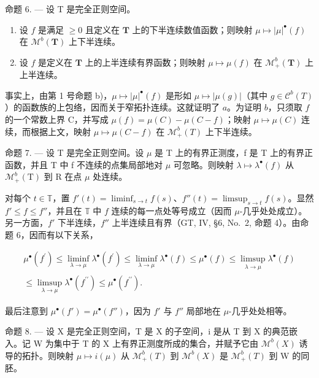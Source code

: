 命题 6. --- 设 T 是完全正则空间。

\begin{enumerate}
\def\labelenumi{\alph{enumi})}
\item
  设 \(f\) 是满足 \(\geqslant 0\) 且定义在 \(\mathbf{T}\) 上的下半连续数值函数；则映射 \(\mu \mapsto |\mu|^{\bullet}(f)\) 在 \(\mathcal{M}^b(\mathbf{T})\) 上下半连续。
\item
  设 \(f\) 是定义在 \(\mathbf{T}\) 上的上半连续有界函数；则映射 \(\mu \mapsto \mu(f)\) 在 \(\mathcal{M}_+^b(\mathbf{T})\) 上上半连续。
\end{enumerate}

事实上，由第 1 号命题 b)，\(\mu \mapsto |\mu|^{\bullet}(f)\) 是形如 \(\mu \mapsto |\mu(g)|\)（其中 \(g \in \mathcal{C}^b(T)\)）的函数族的上包络，因而关于窄拓扑连续。这就证明了 \(a\)。为证明 \(b\)，只须取 \(f\) 的一个常数上界 C，并写成 \(\mu(f) = \mu(C) - \mu(C - f)\)；映射 \(\mu \mapsto \mu(C)\) 连续，而根据上文，映射 \(\mu \mapsto \mu(C - f)\) 在 \(\mathcal{M}_+^b(T)\) 上下半连续。

命题 7. --- 设 T 是完全正则空间。设 \(\mu\) 是 T 上的有界正测度，f 是 T 上的有界正函数，并且 T 中 f 不连续的点集局部地对 \(\mu\) 可忽略。则映射 \(\lambda \mapsto \lambda^{\bullet}(f)\) 从 \(\mathcal{M}_{+}^{b}(\mathrm{T})\) 到 R 在点 \(\mu\) 处连续。

对每个 \(t \in \mathbb{T}\)，置 \(f'(t) = \liminf_{s \to t} f(s)\)、\(f''(t) = \limsup_{s \to t} f(s)\)。显然 \(f' \leqslant f \leqslant f''\)，并且在 \(\mathbb{T}\) 中 \(f\) 连续的每一点处等号成立（因而 \(\mu\)-几乎处处成立）。另一方面，\(f'\) 下半连续，\(f''\) 上半连续且有界（GT, IV, §6, No.~2, 命题 4）。由命题 6，因而有以下关系，

\[
\begin{array}{c} \mu^ {\bullet} (f ^ {\prime}) \leqslant \liminf _ {\lambda \to \mu} \lambda^ {\bullet} (f ^ {\prime}) \leqslant \liminf _ {\lambda \to \mu} \lambda^ {\bullet} (f) \leqslant \mu^ {\bullet} (f) \leqslant \limsup _ {\lambda \to \mu} \lambda^ {\bullet} (f) \\ \leqslant \limsup _ {\lambda \to \mu} \lambda^ {\bullet} (f ^ {\prime \prime}) \leqslant \mu^ {\bullet} (f ^ {\prime \prime}). \end{array}
\]

最后注意到 \(\mu^{\bullet}(f') = \mu^{\bullet}(f'')\)，因为 \(f'\) 与 \(f''\) 局部地在 \(\mu\)-几乎处处相等。

命题 8. --- 设 X 是完全正则空间，T 是 X 的子空间，i 是从 T 到 X 的典范嵌入。记 W 为集中于 T 的 X 上有界正测度所成的集合，并赋予它由 \(\mathcal{M}^{b}(X)\) 诱导的拓扑。则映射 \(\mu \mapsto i(\mu)\) 从 \(\mathcal{M}_{+}^{b}(T)\) 到 \(\mathcal{M}^{b}(X)\) 是 \(\mathcal{M}_{+}^{b}(T)\) 到 W 的同胚。

